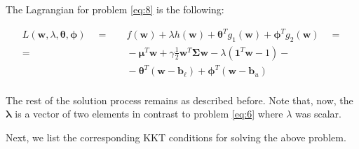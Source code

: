 \documentclass{beamer}
\begin{document}
\begin{frame}

\justifying
The Lagrangian for problem \eqref{eq:8} is the following:

\justifying
\begin{equation*}
\begin{aligned}
	L\left(\mathbf{w},\lambda,\boldsymbol\theta,\boldsymbol\phi\right) \quad = & \quad f\left(\mathbf{w}\right) + \lambda h\left(\mathbf{w}\right) + \boldsymbol\theta^{T} g_{1}\left(\mathbf{w}\right) + \boldsymbol\phi^{T} g_{2}\left(\mathbf{w}\right) \quad = \\
	 = & \quad -\boldsymbol\mu^{T} \mathbf{w} + \gamma \frac{1}{2}\mathbf{w}^{T}\mathbf{\Sigma}\mathbf{w} - \lambda \left(\mathbf{1}^{T} \mathbf{w} - 1\right) - \\
	& \quad - \boldsymbol\theta^{T} \left( \mathbf{w}-\mathbf{b}_{\ell} \right) + \boldsymbol\phi^{T} \left( \mathbf{w}-\mathbf{b}_{u} \right)\\
\end{aligned}
\end{equation*}

\vspace{0.4cm}
\justifying
The rest of the solution process remains as described before. Note that, now, the $\boldsymbol\lambda$ is a vector of two elements in contrast to problem \eqref{eq:6} where $\lambda$ was scalar.

\vspace{0.4cm}
\justifying
Next, we list the corresponding KKT conditions for solving the above problem.

\end{frame}
\end{document}
